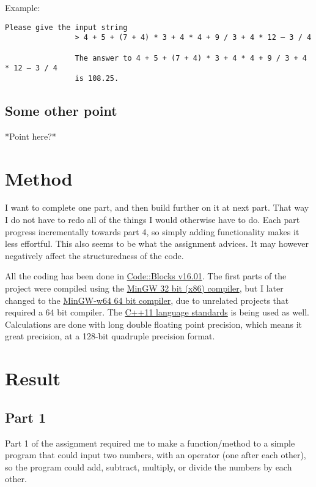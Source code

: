 \documentclass{article}
\begin{document}
			Example:
			\begin{lstlisting}[numbers=none]
				Please give the input string
				> 4 + 5 + (7 + 4) * 3 + 4 * 4 + 9 / 3 + 4 * 12 – 3 / 4
				
				The answer to 4 + 5 + (7 + 4) * 3 + 4 * 4 + 9 / 3 + 4 * 12 – 3 / 4
				is 108.25.
			\end{lstlisting}
		\subsection{Some other point}
			*Point here?*
	
	
	\section{Method}
		I want to complete one part, and then build further on it at next part. That way I do not have to redo all of the things I would otherwise have to do. Each part progress incrementally towards part 4, so simply adding functionality makes it less effortful. This also seems to be what the assignment advices. It may however negatively affect the structuredness of the code.
		
		All the coding has been done in
		\href{http://www.codeblocks.org/}{Code::Blocks v16.01}.
		The first parts of the project were compiled using the \href{https://sourceforge.net/projects/mingw/files/}{MinGW 32 bit (x86) compiler}, but I later changed to the \href{https://sourceforge.net/projects/mingw-w64/}{MinGW-w64 64 bit compiler}, due to unrelated projects that required a 64 bit compiler.
		The \href{http://www.stroustrup.com/C++11FAQ.html}{C++11 language standards} is being used as well.
		Calculations are done with long double floating point precision\cite{cpplang4}, which means it great precision, at a 128-bit quadruple precision format. \cite{doubleArithmetic} \cite{wikiDouble} \cite{wikiLongDouble}
	
	
	\section{Result}
		\subsection{Part 1}
			Part 1 of the assignment required me to make a function/method to a simple program that could input two numbers, with an operator (one after each other), so the program could add, subtract, multiply, or divide the numbers by each other.
			
\end{document}

